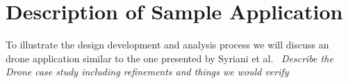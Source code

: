 

\section{Description of Sample Application}

To illustrate the design development and analysis process we will discuss an drone application similar to 
the one presented by Syriani et al.~\cite{Syriani_2019}
\emph{Describe the Drone case study including refinements and things we would verify}
